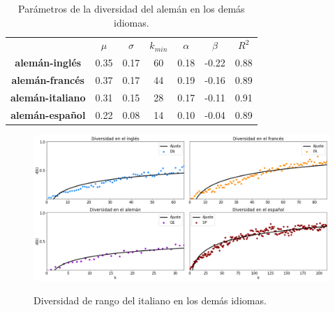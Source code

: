 \begin{table}[h!]
	\centering
	\begin{tabular}{ccccccc}
		\textbf{}                & \textbf{$\mu$} & \textbf{$\sigma$} & \textbf{$k_{min}$} & \textbf{$\alpha$} & \textbf{$\beta$} & \textbf{$R^{2}$} \\
		\textbf{alemán-inglés}  & 0.35          & 0.17                & 60                   & 0.18           & -0.22        & 0.88        \\
		\textbf{alemán-francés}   & 0.37           & 0.17                & 44                    & 0.19           & -0.16         & 0.89        \\
		\textbf{alemán-italiano} & 0.31           & 0.15                & 28                    & 0.17           & -0.11         & 0.91        \\
		\textbf{alemán-español}  & 0.22          & 0.08                & 14                    & 0.10           & -0.04         & 0.89       
	\end{tabular}
	\caption{Parámetros de la diversidad del alemán en los demás idiomas.}
	\label{tab.DR_GE}
\end{table}


\newpage

\begin{figure}[h!]
	\centering
	\includegraphics[width=1 \textwidth, scale = .38]{Cap_6/DR_IT.png}
	\label{fig.DR_IT}
	\caption{Diversidad de rango del italiano en los demás idiomas.}
\end{figure}


